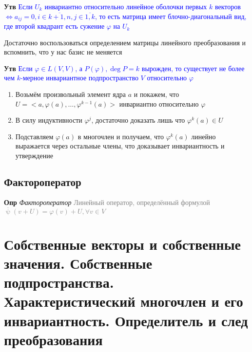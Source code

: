 \documentclass[a4paper, 14pt]{article}
\begin{document}
    \textbf{Утв} \textcolor{blue}{Если $U_k$ инвариантно относительно линейное оболочки первых $k$ векторов
        $\Leftrightarrow a_{ij} = 0, i \in \overline{k+1, n}, j \in \overline{1, k}$, то есть матрица имеет
        блочно-диагональный вид, где второй квадрант есть сужение $\varphi$ на $U_k$}

    Достаточно воспользоваться определением матрицы линейного преобразования и вспомнить, что у нас базис не меняется

    \textbf{Утв} \textcolor{blue}{Если $\varphi \in L(V, V)$, а $P(\varphi), \deg P = k$ вырожден, то существует не
    более чем $k$-мерное инвариантное подпространство $V$ относительно $\varphi$}

    \begin{enumerate}
        \item Возьмём произвольный элемент ядра $a$ и покажем, что $U = <a, \varphi(a), \dots, \varphi^{k-1}(a)>$
        инвариантно относительно $\varphi$
        \item В силу индуктивности $\varphi^j$, достаточно доказать лишь что $\varphi^k (a) \in U$
        \item Подставляем $\varphi(a)$ в многочлен и получаем, что $\varphi^k (a)$ линейно выражается через остальные
        члены, что доказывает инвариантность и утверждение
    \end{enumerate}

    \subsection{Фактороператор}

    \textbf{Опр} \textit{Фактороператор} \textcolor{gray}{Линейный оператор, определённый формулой $\overline{\uppsi
    } (v + U) = \varphi (v) + U, \forall v \in V$}

    \section{Собственные векторы и собственные значения.
    Собственные подпространства.
    Характеристический многочлен и его инвариантность.
    Определитель и след преобразования}

    
\end{document}
